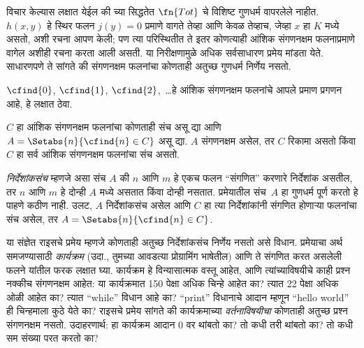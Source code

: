\documentclass[../../../include/open-logic-section]{subfiles}
\begin{document}

विचार केल्यास लक्षात येईल की 
च्या सिद्धतेत $\fn{Tot}$ चे विशिष्ट गुणधर्म वापरलेले नाहीत.
$h(x,y)$ हे स्थिर फलन $j(y) = 0$ प्रमाणे वागते तेव्हा आणि केवळ
तेव्हाच, जेव्हा $x$ हा $K$ मध्ये असतो, अशी रचना आपण केली; पण त्या
परिस्थितीत ते इतर कोणत्याही आंशिक संगणनक्षम फलनाप्रमाणे
वागेल अशीही रचना करता आली असती. या निरीक्षणामुळे अधिक
सर्वसाधारण प्रमेय मांडता येते. साधारणपणे ते सांगते की
संगणनक्षम फलनांचा कोणताही अतुच्छ गुणधर्म निर्णेय नसतो.

$\cfind{0}$, $\cfind{1}$, $\cfind{2}$,~\dots हे आंशिक
संगणनक्षम फलनांचे आपले प्रमाण प्रगणन आहे, हे लक्षात ठेवा.

\begin{thm}[राइसचे प्रमेय]
  $C$ हा आंशिक संगणनक्षम फलनांचा कोणताही संच असू द्या आणि $A =
  \Setabs{n}{\cfind{n} \in C}$ असू द्या. $A$ संगणनक्षम असेल,
  तर $C$ रिकामा असतो किंवा $C$ हा सर्व आंशिक संगणनक्षम
  फलनांचा संच असतो.
\end{thm}

{\em निर्देशांकसंच} म्हणजे असा संच $A$ की $n$ आणि $m$ हे
एकच फलन ``संगणित'' करणारे निर्देशांक असतील, तर $n$ आणि
$m$ हे दोन्ही $A$ मध्ये असतात किंवा दोन्ही नसतात. प्रमेयातील संच~$A$
हा गुणधर्म पूर्ण करतो हे पाहणे कठीण नाही. उलट, $A$
निर्देशांकसंच असेल आणि $C$ हा त्या निर्देशांकांनी संगणित
होणाऱ्या फलनांचा संच असेल, तर $A = \Setabs{n}{\cfind{n} \in C}$.

\begin{explain}
या संज्ञेत राइसचे प्रमेय म्हणजे कोणताही अतुच्छ निर्देशांकसंच
निर्णेय नसतो असे विधान. प्रमेयाचा अर्थ समजण्यासाठी
\emph{कार्यक्रम} (उदा., तुमच्या आवडत्या प्रोग्रामिंग भाषेतील)
आणि ते संगणित करत असलेली फलने यांतील फरक लक्षात घ्या.
कार्यक्रम हे विन्यासात्मक वस्तू आहेत, आणि त्यांच्याविषयीचे
काही प्रश्न नक्कीच संगणनक्षम आहेत: या कार्यक्रमात 150
पेक्षा अधिक चिन्हे आहेत का? त्यात 22 पेक्षा अधिक ओळी
आहेत का? त्यात ``while'' विधान आहे का? ``print'' विधानाचे
आदान म्हणून ``hello world'' ही चिन्हमाला कुठे येते का?
राइसचे प्रमेय सांगते की कार्यक्रमाच्या \emph{वर्तनाविषयीचा}
कोणताही अतुच्छ प्रश्न संगणनक्षम नसतो. उदाहरणार्थ: हा
कार्यक्रम आदान $0$ वर थांबतो का? तो कधी तरी थांबतो का?
तो कधी सम संख्या परत करतो का?
\end{explain}
\end{document}
